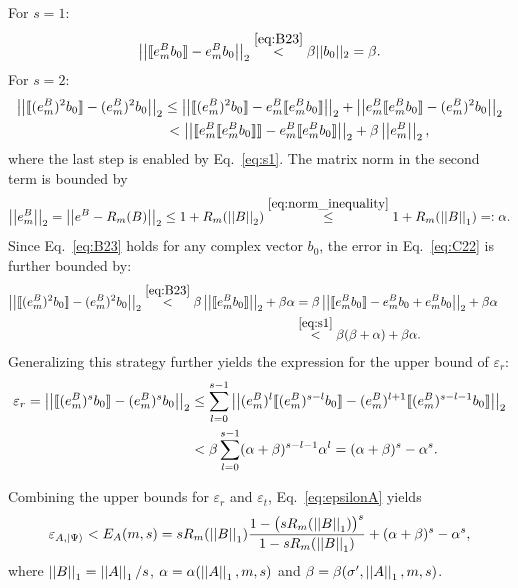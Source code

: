 For $s=1$: 
\begin{equation}
\label{eq:s1}
    \left|\left|\llbracket e^B_mb_0\rrbracket-e^B_mb_0 \right|\right|_2\overset{\eqref{eq:B23}}{<}\beta||b_0||_2=\beta.
\end{equation}
For $s=2$:
\begin{align}
\label{eq:C22}
\nonumber    \left|\left|\llbracket (e^B_m)^2b_0\rrbracket-(e^B_m)^2b_0 \right|\right|_2 &\leq\left|\left|\llbracket (e^B_m)^2b_0\rrbracket-     
    e^B_m\llbracket e^B_mb_0\rrbracket\right|\right|_2+\left|\left|e^B_m\llbracket e^B_mb_0\rrbracket-(e^B_m)^2b_0\right|\right|_2\\
   &\, <\left|\left|\llbracket e^B_m \llbracket e^B_mb_0\rrbracket\rrbracket-     
    e^B_m\llbracket e^B_mb_0\rrbracket\right|\right|_2+\beta\left|\left|e^B_m\right|\right|_2,
\end{align} 
where the last step is enabled by Eq.~\eqref{eq:s1}.
The matrix norm in the second term is bounded by
\begin{equation}
    \left|\left|e^B_m\right|\right|_2=\left|\left|e^B-R_m(B)\right|\right|_2\leq 1+R_m(\left|\left|B\right|\right|_2)\overset{\eqref{eq:norm_inequality}}{\leq} 1+R_m(\left|\left|B\right|\right|_1)=:\alpha.
\end{equation}
Since Eq.~\eqref{eq:B23} holds for any complex vector $b_0$, the error in Eq.~\eqref{eq:C22} is further bounded by:
\begin{align}
    \left|\left|\llbracket (e^B_m)^2b_0\rrbracket-(e^B_m)^2b_0 \right|\right|_2\overset{\eqref{eq:B23}}{<}\beta\left|\left|\llbracket e^B_mb_0\rrbracket\right|\right|_2+\beta\alpha &=\beta\left|\left|\llbracket e^B_mb_0\rrbracket-e^B_mb_0+e^B_mb_0\right|\right|_2+\beta\alpha\quad\\
    &\overset{\eqref{eq:s1}}{<}\beta(\beta+\alpha)+\beta\alpha.
\end{align}
Generalizing this strategy further yields the expression for the upper bound of $\varepsilon_r$: 
\begin{align}
\label{eq:rounding}
\nonumber    \varepsilon_r=\left|\left|\llbracket (e^B_m)^sb_0\rrbracket-(e^B_m)^sb_0 \right|\right|_2 &\leq \sum_{l=0}^{s-1}\left|\left|(e^B_m)^l \llbracket (e^B_m)^{s-l}b_0\rrbracket-(e^B_m)^{l+1}\llbracket (e^B_m)^{s-l-1}b_0\rrbracket\right|\right|_2\\
    &<\beta\sum_{l=0}^{s-1}(\alpha+\beta)^{s-l-1}\alpha^{l}=(\alpha+\beta)^s-\alpha^s.
\end{align}    

Combining the upper bounds for $\varepsilon_r$ and $\varepsilon_t$, Eq.~\eqref{eq:epsilonA} yields
\begin{equation}
\label{eq:overallupperbound}
\varepsilon_{A,|\Psi\rangle}< E_A(m,s)=sR_m(\left|\left|B\right|\right|_1)\frac{1-\big(sR_m(\left|\left|B\right|\right|_1)\big)^s}{1-sR_m(\left|\left|B\right|\right|_1)}+(\alpha+\beta)^s-\alpha^s,
\end{equation}
where $\left|\left|B\right|\right|_1=\left|\left|A\right|\right|_1/s$, $\alpha=\alpha(\left|\left|A\right|\right|_1,m,s)$ and $\beta=\beta(\sigma',\left|\left|A\right|\right|_1,m,s)$.

